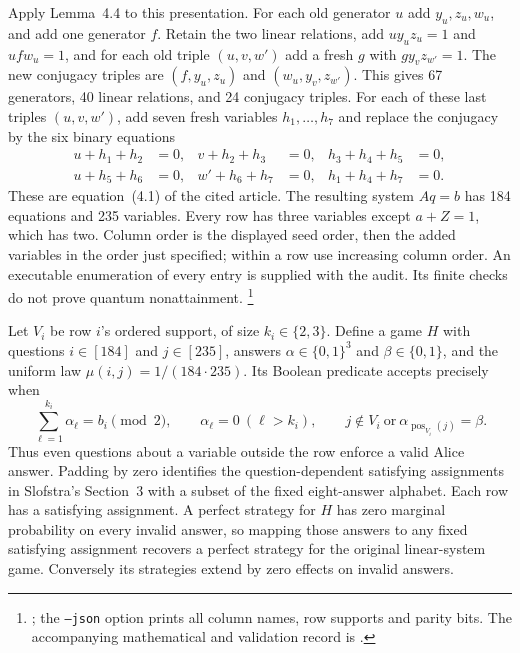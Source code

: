 \documentclass[11pt]{article}
\begin{document}
Apply Lemma~4.4 to this presentation. For each old generator $u$ add
$y_u,z_u,w_u$, and add one generator $f$. Retain the two linear relations,
add $u y_u z_u=1$ and $u f w_u=1$, and for each old triple $(u,v,w')$
add a fresh $g$ with $g y_v z_{w'}=1$. The new conjugacy triples are
$(f,y_u,z_u)$ and $(w_u,y_v,z_{w'})$. This gives 67 generators,
40 linear relations, and 24 conjugacy triples. For each of these last
triples $(u,v,w')$, add seven fresh variables $h_1,\ldots,h_7$ and replace
the conjugacy by the six binary equations
\[
\begin{aligned}
 u+h_1+h_2&=0,&v+h_2+h_3&=0,&h_3+h_4+h_5&=0,\\
 u+h_5+h_6&=0,&w'+h_6+h_7&=0,&h_1+h_4+h_7&=0.
\end{aligned}
\]
These are equation~(4.1) of the cited article. The resulting system
$Aq=b$ has 184 equations and 235 variables. Every row has three variables
except $a+Z=1$, which has two. Column order is the displayed seed order,
then the added variables in the order just specified; within a row use
increasing column order. An executable enumeration of every entry is supplied
with the audit. Its finite checks do not prove quantum nonattainment.%
\footnote{;
the \texttt{--json} option prints all column names, row supports and parity bits.
The accompanying mathematical and validation record is
.}

Let $V_i$ be row $i$'s ordered support, of size $k_i\in\{2,3\}$.
Define a game $H$ with questions $i\in[184]$ and $j\in[235]$, answers
$\alpha\in\{0,1\}^3$ and $\beta\in\{0,1\}$, and the uniform law
$\mu(i,j)=1/(184\cdot235)$. Its Boolean predicate accepts precisely when
\[
 \sum_{\ell=1}^{k_i}\alpha_\ell=b_i\pmod 2,\qquad
 \alpha_\ell=0\ (\ell>k_i),\qquad
 j\notin V_i\ \text{or}\ \alpha_{\operatorname{pos}_{V_i}(j)}=\beta.
\]
Thus even questions about a variable outside the row enforce a valid Alice
answer. Padding by zero identifies the question-dependent satisfying
assignments in Slofstra's Section~3 with a subset of the fixed eight-answer
alphabet. Each row has a satisfying assignment. A perfect strategy for $H$
has zero marginal probability on every invalid answer, so mapping those
answers to any fixed satisfying assignment recovers a perfect strategy for
the original linear-system game. Conversely its strategies extend by zero
effects on invalid answers.
\end{document}
